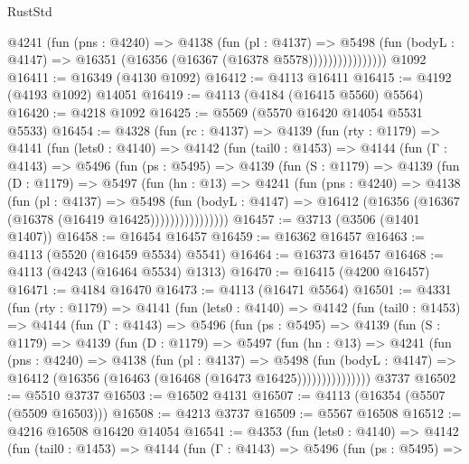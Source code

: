 \begin{lexlean}{RustStd}
\begin{coremodule}
                      @4241
                        (fun (pns : @4240) =>
                        @4138
                          (fun (pl : @4137) =>
                          @5498
                            (fun (bodyL : @4147) =>
                            @16351 (@16356 (@16367 (@16378 @5578))))))))))))))))
    @1092
@16411 := @16349 (@4130 @1092)
@16412 := @4113 @16411
@16415 := @4192 (@4193 @1092) @14051
@16419 := @4113 (@4184 (@16415 @5560) @5564)
@16420 := @4218 @1092
@16425 := @5569 (@5570 @16420 @14054 @5531 @5533)
@16454 := @4328
    (fun (rc : @4137) =>
    @4139
      (fun (rty : @1179) =>
      @4141
        (fun (lets0 : @4140) =>
        @4142
          (fun (tail0 : @1453) =>
          @4144
            (fun (Γ : @4143) =>
            @5496
              (fun (ps : @5495) =>
              @4139
                (fun (S : @1179) =>
                @4139
                  (fun (D : @1179) =>
                  @5497
                    (fun (hn : @13) =>
                    @4241
                      (fun (pns : @4240) =>
                      @4138
                        (fun (pl : @4137) =>
                        @5498
                          (fun (bodyL : @4147) =>
                          @16412 (@16356 (@16367 (@16378 (@16419 @16425))))))))))))))))
@16457 := @3713 (@3506 (@1401 @1407))
@16458 := @16454 @16457
@16459 := @16362 @16457
@16463 := @4113 (@5520 (@16459 @5534) @5541)
@16464 := @16373 @16457
@16468 := @4113 (@4243 (@16464 @5534) @1313)
@16470 := @16415 (@4200 @16457)
@16471 := @4184 @16470
@16473 := @4113 (@16471 @5564)
@16501 := @4331
    (fun (rty : @1179) =>
    @4141
      (fun (lets0 : @4140) =>
      @4142
        (fun (tail0 : @1453) =>
        @4144
          (fun (Γ : @4143) =>
          @5496
            (fun (ps : @5495) =>
            @4139
              (fun (S : @1179) =>
              @4139
                (fun (D : @1179) =>
                @5497
                  (fun (hn : @13) =>
                  @4241
                    (fun (pns : @4240) =>
                    @4138
                      (fun (pl : @4137) =>
                      @5498
                        (fun (bodyL : @4147) =>
                        @16412 (@16356 (@16463 (@16468 (@16473 @16425)))))))))))))))
    @3737
@16502 := @5510 @3737
@16503 := @16502 @4131
@16507 := @4113 (@16354 (@5507 (@5509 @16503)))
@16508 := @4213 @3737
@16509 := @5567 @16508
@16512 := @4216 @16508 @16420 @14054
@16541 := @4353
    (fun (lets0 : @4140) =>
    @4142
      (fun (tail0 : @1453) =>
      @4144
        (fun (Γ : @4143) =>
        @5496
          (fun (ps : @5495) =>

\end{coremodule}
\end{lexlean}

